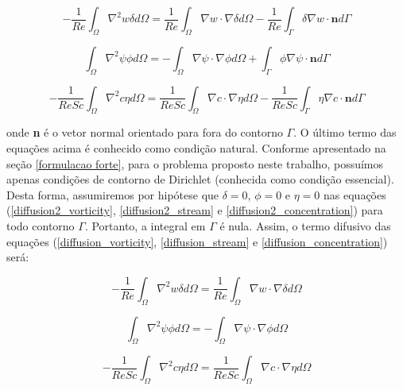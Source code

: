 \begin{equation} \label{diffusion2_vorticity} 
 - \frac{1}{\textit{Re}} \int_{\Omega} \nabla^2 w \delta d\Omega
 = \frac{1}{\textit{Re}} \int_{\Omega} \nabla w \cdot \nabla \delta d\Omega
 - \frac{1}{\textit{Re}} \int_{\Gamma} \delta \nabla w \cdot \textbf{n} d\Gamma
\end{equation}

\begin{equation} \label{diffusion2_stream} 
 \int_{\Omega} \nabla^2 \psi \phi d\Omega
 = - \int_{\Omega} \nabla \psi \cdot \nabla \phi d\Omega
   + \int_{\Gamma} \phi \nabla \psi \cdot \textbf{n} d\Gamma
\end{equation}

\begin{equation} \label{diffusion2_concentration} 
 - \frac{1}{\textit{ReSc}} \int_{\Omega} \nabla^2 c \eta d\Omega
 = \frac{1}{\textit{ReSc}} \int_{\Omega} \nabla c \cdot \nabla \eta d\Omega
 - \frac{1}{\textit{ReSc}} \int_{\Gamma} \eta \nabla c \cdot \textbf{n} d\Gamma
\end{equation}

\noindent
onde \textbf{n} é o vetor normal orientado para fora do contorno $\Gamma$.
O último termo das equações acima é conhecido como condição natural. Conforme apresentado na seção \ref{formulacao forte},
para o problema proposto neste trabalho, possuímos apenas condições de contorno de Dirichlet 
(conhecida como condição essencial). Desta forma, assumiremos por hipótese que
$\delta = 0$, $\phi = 0$ e $\eta = 0$ nas equações (\ref{diffusion2_vorticity}, \ref{diffusion2_stream} e \ref{diffusion2_concentration})
para todo contorno $\Gamma$. Portanto, a integral em $\Gamma$ é nula.
Assim, o termo difusivo das equações (\ref{diffusion_vorticity}, \ref{diffusion_stream} e \ref{diffusion_concentration}) será:

\begin{equation}
 - \frac{1}{\textit{Re}} \int_{\Omega} \nabla^2 w \delta d\Omega
 = \frac{1}{\textit{Re}} \int_{\Omega} \nabla w \cdot \nabla \delta d\Omega
\end{equation}

\begin{equation} 
 \int_{\Omega} \nabla^2 \psi \phi d\Omega
 = - \int_{\Omega} \nabla \psi \cdot \nabla \phi d\Omega
\end{equation}

\begin{equation} 
 - \frac{1}{\textit{ReSc}} \int_{\Omega} \nabla^2 c \eta d\Omega
 = \frac{1}{\textit{ReSc}} \int_{\Omega} \nabla c \cdot \nabla \eta d\Omega
\end{equation}

